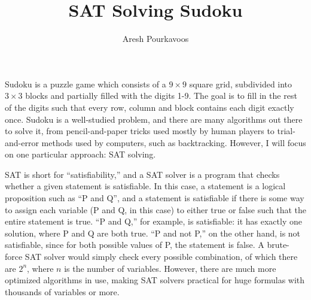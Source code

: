 \documentclass{article}
\begin{document}
\title{SAT Solving Sudoku}
\author{Aresh Pourkavoos}
\maketitle

Sudoku is a puzzle game which consists of a $9 \times 9$ square grid,
subdivided into $3 \times 3$ blocks
and partially filled with the digits 1-9.
The goal is to fill in the rest of the digits such that
every row, column and block contains each digit exactly once.
Sudoku is a well-studied problem,
and there are many algorithms out there to solve it,
from pencil-and-paper tricks used mostly by human players
to trial-and-error methods used by computers, such as backtracking.
However, I will focus on one particular approach: SAT solving.

SAT is short for ``satisfiability,''
and a SAT solver is a program that checks
whether a given statement is satisfiable.
In this case, a statement is a logical proposition
such as ``P and Q'',
and a statement is satisfiable
if there is some way to assign each variable
(P and Q, in this case) to either true or false
such that the entire statement is true.
``P and Q,'' for example, is satisfiable:
it has exactly one solution, where P and Q are both true.
``P and not P,'' on the other hand, is not satisfiable,
since for both possible values of P, the statement is false.
A brute-force SAT solver would simply check every possible combination,
of which there are $2^n$, where $n$ is the number of variables.
However, there are much more optimized algorithms in use,
making SAT solvers practical for huge formulas with thousands of variables or more.
\end{document}
